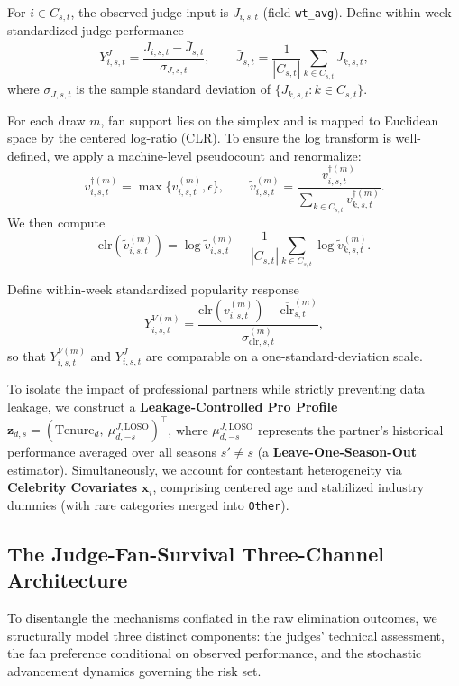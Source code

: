 \begin{definition}
For $i\in C_{s,t}$, the observed judge input is $J_{i,s,t}$ (field \texttt{wt\_avg}).
Define within-week standardized judge performance
\[
Y^J_{i,s,t}=\frac{J_{i,s,t}-\bar J_{s,t}}{\sigma_{J,s,t}},\qquad
\bar J_{s,t}=\frac{1}{|C_{s,t}|}\sum_{k\in C_{s,t}}J_{k,s,t},
\]
where $\sigma_{J,s,t}$ is the sample standard deviation of $\{J_{k,s,t}:k\in C_{s,t}\}$.
\end{definition}

\begin{definition}
For each draw $m$, fan support lies on the simplex and is mapped to Euclidean space by the centered log-ratio (CLR). To ensure the log transform is well-defined, we apply a machine-level pseudocount and renormalize:
\[
v^{\dagger(m)}_{i,s,t}=\max\{v^{(m)}_{i,s,t},\epsilon\},\qquad
\tilde v^{(m)}_{i,s,t}=\frac{v^{\dagger(m)}_{i,s,t}}{\sum_{k\in C_{s,t}} v^{\dagger(m)}_{k,s,t}}.
\]
We then compute
\[
\mathrm{clr}\!\left(\tilde v^{(m)}_{i,s,t}\right)=
\log \tilde v^{(m)}_{i,s,t}-\frac{1}{|C_{s,t}|}\sum_{k\in C_{s,t}}\log \tilde v^{(m)}_{k,s,t}.
\]

Define within-week standardized popularity response
\[
Y^{V(m)}_{i,s,t}=
\frac{\mathrm{clr}(v^{(m)}_{i,s,t})-\overline{\mathrm{clr}}^{(m)}_{s,t}}{\sigma^{(m)}_{\mathrm{clr},s,t}},
\]
so that $Y^{V(m)}_{i,s,t}$ and $Y^{J}_{i,s,t}$ are comparable on a one-standard-deviation scale.
\end{definition}

To isolate the impact of professional partners while strictly preventing data leakage, we construct a \textbf{Leakage-Controlled Pro Profile} $\mathbf z_{d,s}=(\mathrm{Tenure}_d,\ \mu^{J,\mathrm{LOSO}}_{d,-s})^\top$, where $\mu^{J,\mathrm{LOSO}}_{d,-s}$ represents the partner's historical performance averaged over all seasons $s'\neq s$ (a \textbf{Leave-One-Season-Out} estimator). Simultaneously, we account for contestant heterogeneity via \textbf{Celebrity Covariates} $\mathbf x_i$, comprising centered age and stabilized industry dummies (with rare categories merged into \texttt{Other}).

\subsection{The Judge-Fan-Survival Three-Channel Architecture }
\label{sec:q3_models}

To disentangle the mechanisms conflated in the raw elimination outcomes, we structurally model three distinct components: the judges' technical assessment, the fan preference conditional on observed performance, and the stochastic advancement dynamics governing the risk set.

